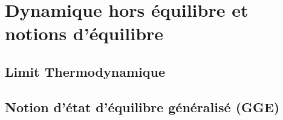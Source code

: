 \section{Dynamique hors équilibre et notions d’équilibre}
\subsection{Limit Thermodynamique}

\subsection{Notion d’état d’équilibre généralisé (GGE)}


